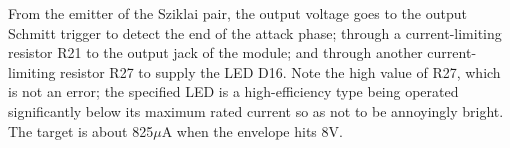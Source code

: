From the emitter of the Sziklai pair, the output voltage goes to the output
Schmitt trigger to detect the end of the attack phase; through a
current-limiting resistor R21 to the output jack of the module; and through
another current-limiting resistor R27 to supply the LED D16.  Note the high
value of R27, which is not an error; the specified LED is a high-efficiency
type being operated significantly below its maximum rated current so as
not to be annoyingly bright.  The target is about 825$\mu$A when the
envelope hits 8V.